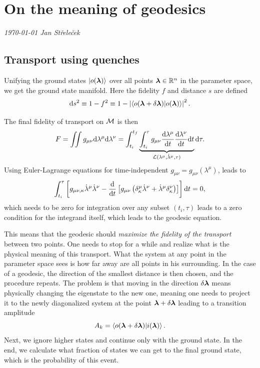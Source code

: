 \chapter{On the meaning of geodesics}
\textit{\today\newline
Jan Střeleček\newline}


\section{Transport using quenches}
\label{sec:quenches}
Unifying the ground states $\ket{o({\bm\lambda})}$ over all points ${\bm\lambda}\in\mathbb{R}^n$ in the parameter space, we get the ground state manifold. Here the fidelity $f$ and distance $s$ are defined
\begin{equation}
    \mathrm{d} s^2 \equiv 1-f^2\equiv 1-\left|\braket{o(\bm{{\bm\lambda}}+\delta\bm{{\bm\lambda}})|o(\bm{{\bm\lambda}})}\right|^2.
    \label{eq:distanceOnM0}
\end{equation}

The final fidelity of transport on $\mathcal{M}$ is then
\begin{equation}
    F=\iint g_{\mu\nu}\mathrm{d}\lambda^\mu\mathrm{d}\lambda^\nu = \int_{t_i}^{t_f}\underbrace{\int_{t_i}^\tau g_{\mu\nu}\frac{\mathrm{d} \lambda^\mu}{\mathrm{d} t}\frac{\mathrm{d} \lambda^\nu}{\mathrm{d} t} \mathrm{d} t}_{\mathcal{L}(\lambda^\mu,\dot\lambda^\mu,\tau)}\mathrm{d} \tau .
\end{equation}
Using Euler-Lagrange equations for time-independent $g_{\mu\nu}=g_{\mu\nu}(\lambda^\mu)$, leads to
\begin{equation}
    \int_{t_i}^{\tau}\left[g_{\mu\nu,\kappa}\dot\lambda^\mu\dot\lambda^\nu - \frac{\mathrm{d} }{\mathrm{d} t}\left[g_{\mu\nu}\left(\delta^\mu_\kappa\dot\lambda^\nu+\dot\lambda^\mu\delta^\nu_\kappa\right)\right]\right]\mathrm{d} t=0,
\end{equation}
which needs to be zero for integration over any subset $(t_i,\tau)$ leads to a zero condition for the integrand itself, which leads to the geodesic equation.

This means that the geodesic should \emph{maximize the fidelity of the transport} between two points. One needs to stop for a while and realize what is the physical meaning of this transport. What the system at any point in the parameter space sees is how far away are all points in his surrounding. In the case of a geodesic, the direction of the smallest distance is then chosen, and the procedure repeats. The problem is that moving in the direction $\delta{\bm\lambda}$ means physically changing the eigenstate to the new one, meaning one needs to project it to the newly diagonalized system at the point ${\bm\lambda}+\delta{\bm\lambda}$ leading to a transition amplitude
$$A_k=\braket{o(\bm{{\bm\lambda}}+\delta\bm{{\bm\lambda}})|i(\bm{{\bm\lambda}})}.$$
Next, we ignore higher states and continue only with the ground state. In the end, we calculate what fraction of states we can get to the final ground state, which is the probability of this event. 
 

